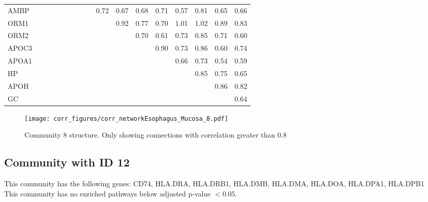 \begin{longtable}{lrrrrrrrrrrrrrrrr}
AMBP  &             &            &           &           &           &           &            &            &       0.72 &       0.67 &        0.68 &        0.71 &     0.57 &       0.81 &     0.65 &       0.66 \\
ORM1  &             &            &           &           &           &           &            &            &            &       0.92 &        0.77 &        0.70 &     1.01 &       1.02 &     0.89 &       0.83 \\
ORM2  &             &            &           &           &           &           &            &            &            &            &        0.70 &        0.61 &     0.73 &       0.85 &     0.71 &       0.60 \\
APOC3 &             &            &           &           &           &           &            &            &            &            &             &        0.90 &     0.73 &       0.86 &     0.60 &       0.74 \\
APOA1 &             &            &           &           &           &           &            &            &            &            &             &             &     0.66 &       0.73 &     0.54 &       0.59 \\
HP    &             &            &           &           &           &           &            &            &            &            &             &             &          &       0.85 &     0.75 &       0.65 \\
APOH  &             &            &           &           &           &           &            &            &            &            &             &             &          &            &     0.86 &       0.82 \\
GC    &             &            &           &           &           &           &            &            &            &            &             &             &          &            &          &       0.64 \\
\end{longtable}


\begin{figure}[h!]
\centering
\texttt{[image: corr\_figures/corr\_networkEsophagus\_Mucosa\_8.pdf]}
\caption{Community 8 structure. Only showing connections with correlation greater than 0.8}
\end{figure}




\subsection*{Community with ID 12}
This community has the following genes: CD74, HLA.DRA, HLA.DRB1, HLA.DMB, HLA.DMA, HLA.DOA, HLA.DPA1, HLA.DPB1
\\
This community has no enriched pathways below adjusted p-value $< 0.05$.

